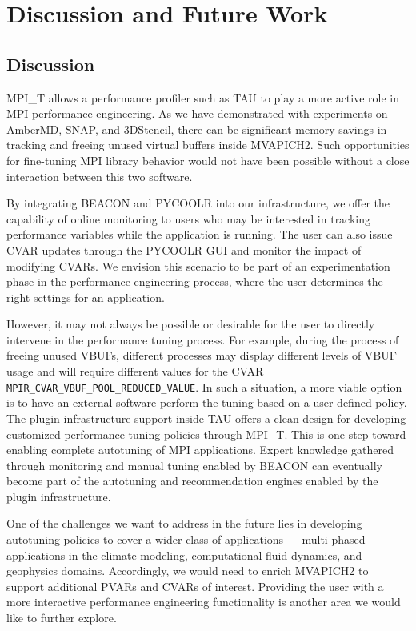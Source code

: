 \chapter{Discussion and Future Work}
\section {Discussion}

MPI\_T allows a performance profiler such as TAU to play a more active role in MPI performance engineering. As we have demonstrated with experiments on AmberMD, SNAP, and 3DStencil, there can be significant memory savings in tracking and freeing unused virtual buffers inside MVAPICH2. Such opportunities for fine-tuning MPI library behavior would not have been possible without a close interaction between this two software.  \par
By integrating BEACON and PYCOOLR into our infrastructure, we offer the capability of online monitoring to users who may be interested in tracking performance variables while the application is running. The user can also issue CVAR updates through the PYCOOLR GUI and monitor the impact of modifying CVARs. We envision this scenario to be part of an experimentation phase in the performance engineering process, where the user determines the right settings for an application. \par
However, it may not always be possible or desirable for the user to directly intervene in the performance tuning process. For example, during the process of freeing unused VBUFs, different processes may display different levels of VBUF usage and will require different values for the CVAR \\ \verb+MPIR_CVAR_VBUF_POOL_REDUCED_VALUE+. In such a situation, a more viable option is to have an external software perform the tuning based on a user-defined policy. The plugin infrastructure support inside TAU offers a clean design for developing customized performance tuning policies through MPI\_T. This is one step toward enabling complete autotuning of MPI applications. Expert knowledge gathered through monitoring and manual tuning enabled by BEACON can eventually become part of the autotuning and recommendation engines enabled by the plugin infrastructure.  \par
One of the challenges we want to address in the future lies in developing autotuning policies to cover a wider class of applications --- multi-phased applications in the climate modeling, computational fluid dynamics, and geophysics domains. Accordingly, we would need to enrich MVAPICH2 to support additional PVARs and CVARs of interest. Providing the user with a more interactive performance engineering functionality is another area we would like to further explore.

